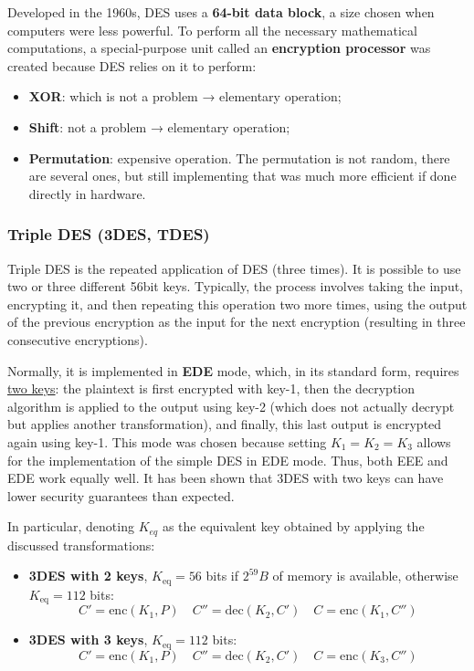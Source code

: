 Developed in the 1960s, DES uses a \textbf{64-bit data block}, a size chosen when computers were less powerful. To perform all the necessary mathematical computations, a special-purpose unit called an \textbf{encryption processor} was created because DES relies on it to perform:

\begin{itemize}
	\item \textbf{XOR}: which is not a problem → elementary operation;
	\item \textbf{Shift}: not a problem → elementary operation;
	\item \textbf{Permutation}: expensive operation. The permutation is not random, there are several ones, but still implementing that was much more efficient if done directly in hardware.
\end{itemize}

\subsubsection{Triple DES (3DES, TDES)}
Triple DES is the repeated application of DES (three times). It is possible to use two or three different 56bit keys.
Typically, the process involves taking the input, encrypting it, and then repeating this operation two more times, using the output of the previous encryption as the input for the next encryption (resulting in three consecutive encryptions).

Normally, it is implemented in \textbf{EDE} mode, which, in its standard form, requires \ul{two keys}: the plaintext is first encrypted with key-1, then the decryption algorithm is applied to the output using key-2 (which does not actually decrypt but applies another transformation), and finally, this last output is encrypted again using key-1.
This mode was chosen because setting $K_1 = K_2 = K_3$ allows for the implementation of the simple DES in EDE mode.
Thus, both EEE and EDE work equally well. It has been shown that 3DES with two keys can have lower security guarantees than expected.

In particular, denoting $K_{eq}$ as the equivalent key obtained by applying the discussed transformations:
\begin{itemize}
	\item \textbf{3DES with 2 keys},
	      \(K_{\text{eq}} = 56\) bits if $2^{59}B$ of memory is available, otherwise \(K_{\text{eq}} = 112\) bits:
	      \[C' = \text{enc}(K_1, P) \quad C'' = \text{dec}(K_2, C') \quad C = \text{enc}(K_1, C'')\]
	\item \textbf{3DES with 3 keys}, \(K_{\text{eq}} = 112\) bits:
	      \[C' = \text{enc}(K_1, P) \quad C'' = \text{dec}(K_2, C') \quad C = \text{enc}(K_3, C'')\]
\end{itemize}

